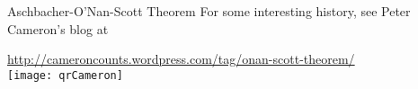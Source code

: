 \begin{frame}[fragile,label=OSTheoremHistory]{Aschbacher-O'Nan-Scott Theorem}
For some interesting history, see Peter Cameron's blog at 
\begin{center}
{\small  \url{http://cameroncounts.wordpress.com/tag/onan-scott-theorem/}}
\\[8pt]
          \texttt{[image: qrCameron]}
        \end{center}

\end{frame}


